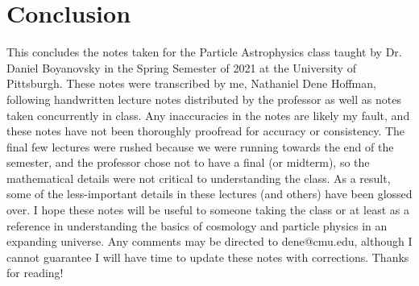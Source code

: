 \documentclass[a4paper,twoside,master.tex]{subfiles}
\begin{document}
\section{Conclusion}\label{sec:conclusion}

This concludes the notes taken for the Particle Astrophysics class taught by Dr. Daniel Boyanovsky in the Spring Semester of 2021 at the University of Pittsburgh. These notes were transcribed by me, Nathaniel Dene Hoffman, following handwritten lecture notes distributed by the professor as well as notes taken concurrently in class. Any inaccuracies in the notes are likely my fault, and these notes have not been thoroughly proofread for accuracy or consistency. The final few lectures were rushed because we were running towards the end of the semester, and the professor chose not to have a final (or midterm), so the mathematical details were not critical to understanding the class. As a result, some of the less-important details in these lectures (and others) have been glossed over. I hope these notes will be useful to someone taking the class or at least as a reference in understanding the basics of cosmology and particle physics in an expanding universe. Any comments may be directed to dene@cmu.edu, although I cannot guarantee I will have time to update these notes with corrections. Thanks for reading!
\end{document}
